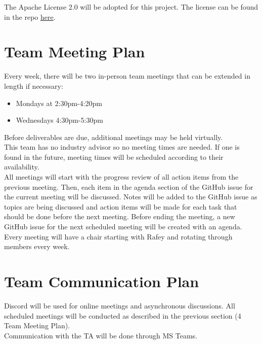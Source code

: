 \documentclass{article}
\begin{document}
The Apache License 2.0 will be adopted for this project. The license can be found in the repo \href{https://github.com/russellrd/realm/blob/main/LICENSE}{here}.

\section{Team Meeting Plan} \label{team_meeting_plan}

Every week, there will be two in-person team meetings that can be extended in length if necessary:
\begin{itemize}
    \item Mondays at 2:30pm-4:20pm
    \item Wednesdays 4:30pm-5:30pm
\end{itemize}

Before deliverables are due, additional meetings may be held virtually. \\

This team has no industry advisor so no meeting times are needed. If one is found in the future, meeting times will be scheduled according to their availability. \\

All meetings will start with the progress review of all action items from the previous meeting. Then, each item in the agenda section of the GitHub issue for the current meeting will be discussed. Notes will be added to the GitHub issue as topics are being discussed and action items will be made for each task that should be done before the next meeting. Before ending the meeting, a new GitHub issue for the next scheduled meeting will be created with an agenda. \\

Every meeting will have a chair starting with Rafey and rotating through members every week.

\section{Team Communication Plan} \label{team_communication_plan}

Discord will be used for online meetings and asynchronous discussions. All scheduled meetings will be conducted as described in the previous section (4 Team Meeting Plan). \\

Communication with the TA will be done through MS Teams. \\
\end{document}
